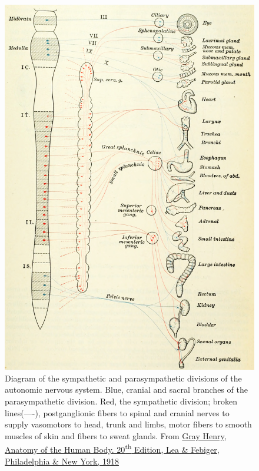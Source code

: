\begin{figure}

{\centering \includegraphics[width=0.7\linewidth]{./figures/pns/GrayAnat1918p971} 

}

\caption{Diagram of the sympathetic and parasympathetic divisions of the autonomic nervous system. Blue, cranial and sacral branches of the parasympathetic division. Red, the sympathetic division; broken lines(----), postganglionic fibers to spinal and cranial nerves to supply vasomotors to head, trunk and limbs, motor fibers to smooth muscles of skin and fibers to sweat glands. From \href{https://archive.org/details/anatomyofhumanbo1918gray/page/n6/mode/2up}{Gray Henry, Anatomy of the Human Body. 20\textsuperscript{th} Edition, Lea \& Febiger, Philadelphia \& New York, 1918}}\label{fig:autonomicdiagram}
\end{figure}

